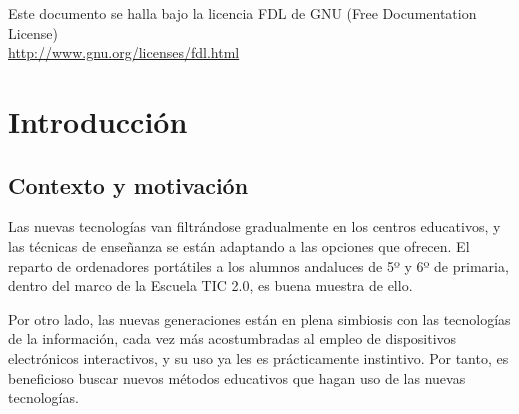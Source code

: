 \documentclass[a4paper,11pt]{article}
\begin{document}
\portada


\vspace{0.5cm}

\begin{center}
{\footnotesize Este documento se halla bajo la licencia FDL de GNU (Free Documentation
  License)\\ \url{http://www.gnu.org/licenses/fdl.html} }   
\end{center}



\tableofcontents

\lstset{style=C++}

\setlength{\parindent}{0.3cm}

\section{Introducción}

\subsection{Contexto y motivación}
Las nuevas tecnologías van filtrándose gradualmente en los centros
educativos, y las técnicas de enseñanza se están adaptando a las
opciones que ofrecen. El reparto de ordenadores portátiles a los
alumnos andaluces de 5º y 6º de primaria, dentro del marco de la
Escuela TIC 2.0, es buena muestra de ello. 

Por otro lado, las nuevas generaciones están en plena simbiosis con las
tecnologías de la información, cada vez más acostumbradas al empleo de
dispositivos electrónicos interactivos, y su uso ya les es prácticamente
instintivo. Por tanto, es beneficioso buscar nuevos métodos educativos que hagan
uso de las nuevas tecnologías.
\end{document}
